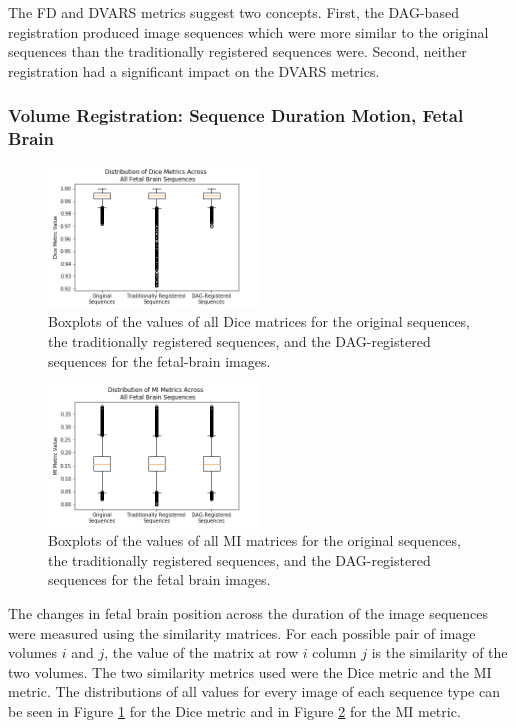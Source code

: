 The FD and DVARS metrics suggest two concepts. First, the DAG-based registration produced image sequences which were more similar to the original sequences than the traditionally registered sequences were. Second, neither registration had a significant impact on the DVARS metrics.

\subsubsection{Volume Registration: Sequence Duration Motion, Fetal Brain}

\begin{figure}
\centering
\includegraphics[width=0.5\textwidth]{6/figures/fetal-brain-dice-box.png}
\caption{Boxplots of the values of all Dice matrices for the original sequences, the traditionally registered sequences, and the DAG-registered sequences for the fetal-brain images.}
\label{fig:fetal-brain-dice-box}
\end{figure}

\begin{figure}
\centering
\includegraphics[width=0.5\textwidth]{6/figures/fetal-brain-mi-box.png}
\caption{Boxplots of the values of all MI matrices for the original sequences, the traditionally registered sequences, and the DAG-registered sequences for the fetal brain images.}
\label{fig:fetal-brain-mi-box}
\end{figure}

The changes in fetal brain position across the duration of the image sequences were measured using the similarity matrices. For each possible pair of image volumes $i$ and $j$, the value of the matrix at row $i$ column $j$ is the similarity of the two volumes. The two similarity metrics used were the Dice metric and the MI metric. The distributions of all values for every image of each sequence type can be seen in Figure \ref{fig:fetal-brain-dice-box} for the Dice metric and in Figure \ref{fig:fetal-brain-mi-box} for the MI metric.

